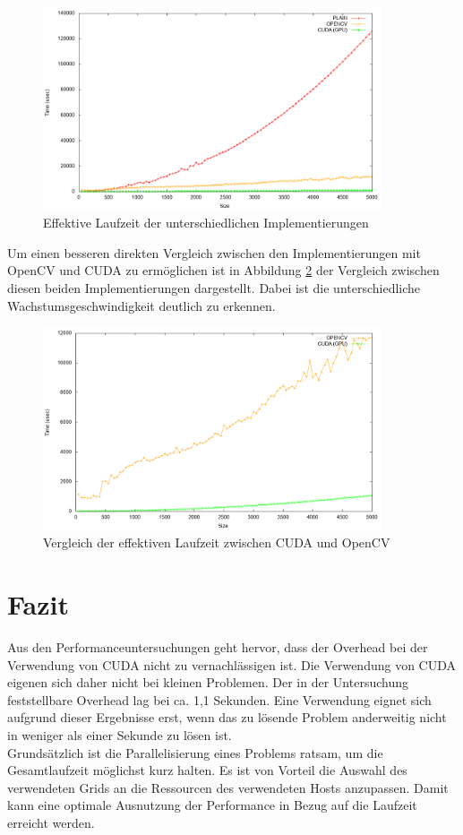 \documentclass{llncs}
\begin{document}
\begin{figure}
	\centering
	\includegraphics[width=10cm,keepaspectratio]{analysis_gpu.png}
	\caption{Effektive Laufzeit der unterschiedlichen Implementierungen}
	\label{fig:analysis_gpu}
\end{figure}
\newpage
Um einen besseren direkten Vergleich zwischen den Implementierungen mit OpenCV und CUDA zu ermöglichen ist in Abbildung \ref{fig:analysis_no_plain} der Vergleich zwischen diesen beiden Implementierungen dargestellt. Dabei ist die unterschiedliche Wachstumsgeschwindigkeit deutlich zu erkennen.

\begin{figure}
	\centering
	\includegraphics[width=10cm,keepaspectratio]{analysis_no_plain.png}
	\caption{Vergleich der effektiven Laufzeit zwischen CUDA und OpenCV}
	\label{fig:analysis_no_plain}
\end{figure}

%
\section{Fazit}
%

Aus den Performanceuntersuchungen geht hervor, dass der Overhead bei der Verwendung von CUDA nicht zu vernachlässigen ist. Die Verwendung von CUDA eigenen sich daher nicht bei kleinen Problemen. Der in der Untersuchung feststellbare Overhead lag bei ca. 1,1 Sekunden. Eine Verwendung eignet sich aufgrund dieser Ergebnisse erst, wenn das zu lösende Problem anderweitig nicht in weniger als einer Sekunde zu lösen ist.\\

Grundsätzlich ist die Parallelisierung eines Problems ratsam, um die Gesamtlaufzeit möglichst kurz halten.
Es ist von Vorteil die Auswahl des verwendeten Grids an die Ressourcen des verwendeten Hosts anzupassen. Damit kann eine optimale Ausnutzung der Performance in Bezug auf die Laufzeit erreicht werden.
%
\end{document}
